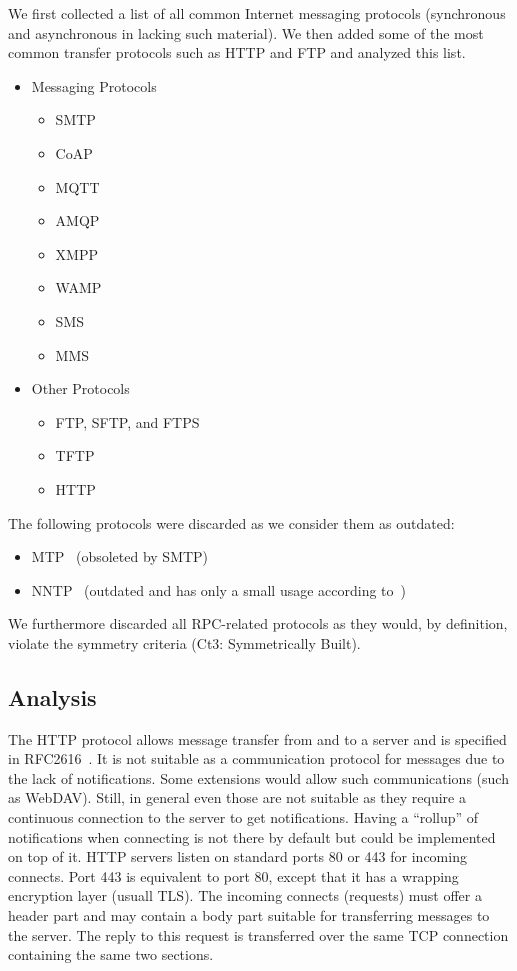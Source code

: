 We first collected a list of all common Internet messaging protocols (synchronous and asynchronous in lacking such material). We then added some of the most common transfer protocols such as HTTP and FTP and analyzed this list.

\begin{itemize}
	\item Messaging Protocols
	\begin{itemize}
		\item SMTP
		\item CoAP
		\item MQTT
		\item AMQP
		\item XMPP
		\item WAMP
		\item SMS
		\item MMS
	\end{itemize}
	\item Other Protocols
	\begin{itemize}
		\item FTP, SFTP, and FTPS
		\item TFTP
		\item HTTP
	\end{itemize}
\end{itemize}

The following protocols were discarded as we consider them as outdated:
\begin{itemize}
	\item MTP~\cite{rfc780} (obsoleted by SMTP)
	\item NNTP~\cite{rfc3977} (outdated and has only a small usage according to~\cite{kim2010today})
\end{itemize}

We furthermore discarded all RPC-related protocols as they would, by definition, violate the symmetry criteria (Ct3: Symmetrically Built).

\subsection{Analysis}
The HTTP protocol allows message transfer from and to a server and is specified in RFC2616~\cite{rfc2616}. It is not suitable as a communication protocol for messages due to the lack of notifications. Some extensions would allow such communications (such as WebDAV). Still, in general even those are not suitable as they require a continuous connection to the server to get notifications. Having a ``rollup'' of notifications when connecting is not there by default but could be implemented on top of it. HTTP servers listen on standard ports 80 or 443 for incoming connects. Port 443 is equivalent to port 80, except that it has a wrapping encryption layer (usuall TLS). The incoming connects (requests) must offer a header part and may contain a body part suitable for transferring messages to the server. The reply to this request is transferred over the same TCP connection containing the same two sections.


